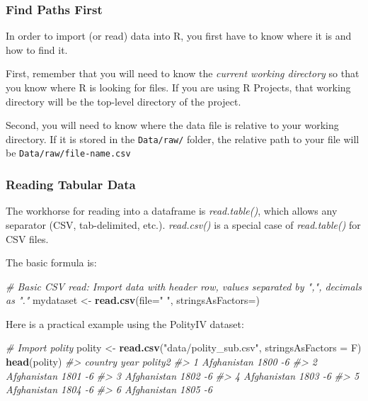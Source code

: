 \documentclass[
]{book}
\newenvironment{Shaded}{\begin{snugshade}}{\end{snugshade}}
\newcommand{\CommentTok}[1]{\textcolor[rgb]{0.56,0.35,0.01}{\textit{#1}}}
\newcommand{\DataTypeTok}[1]{\textcolor[rgb]{0.13,0.29,0.53}{#1}}
\newcommand{\KeywordTok}[1]{\textcolor[rgb]{0.13,0.29,0.53}{\textbf{#1}}}
\newcommand{\NormalTok}[1]{#1}
\newcommand{\StringTok}[1]{\textcolor[rgb]{0.31,0.60,0.02}{#1}}
\begin{document}
\hypertarget{find-paths-first}{%
\subsubsection*{Find Paths First}\label{find-paths-first}}

In order to import (or read) data into R, you first have to know where it is and how to find it.

First, remember that you will need to know the \emph{current working directory} so that you know where R is looking for files. If you are using R Projects, that working directory will be the top-level directory of the project.

Second, you will need to know where the data file is relative to your working directory. If it is stored in the \texttt{Data/raw/} folder, the relative path to your file will be \texttt{Data/raw/file-name.csv}

\hypertarget{reading-tabular-data}{%
\subsubsection*{Reading Tabular Data}\label{reading-tabular-data}}

The workhorse for reading into a dataframe is \emph{read.table()}, which allows any separator (CSV, tab-delimited, etc.). \emph{read.csv()} is a special case of \emph{read.table()} for CSV files.

The basic formula is:

\begin{Shaded}
\begin{Highlighting}[]
\CommentTok{# Basic CSV read: Import data with header row, values separated by ",", decimals as "."}
\NormalTok{mydataset <-}\StringTok{ }\KeywordTok{read.csv}\NormalTok{(}\DataTypeTok{file=}\StringTok{"  "}\NormalTok{, }\DataTypeTok{stringsAsFactors=}\NormalTok{)}
\end{Highlighting}
\end{Shaded}

Here is a practical example using the PolityIV dataset:

\begin{Shaded}
\begin{Highlighting}[]
\CommentTok{# Import polity}
\NormalTok{polity <-}\StringTok{ }\KeywordTok{read.csv}\NormalTok{(}\StringTok{"data/polity_sub.csv"}\NormalTok{, }\DataTypeTok{stringsAsFactors =}\NormalTok{ F)}
\KeywordTok{head}\NormalTok{(polity)}
\CommentTok{#>       country year polity2}
\CommentTok{#> 1 Afghanistan 1800      -6}
\CommentTok{#> 2 Afghanistan 1801      -6}
\CommentTok{#> 3 Afghanistan 1802      -6}
\CommentTok{#> 4 Afghanistan 1803      -6}
\CommentTok{#> 5 Afghanistan 1804      -6}
\CommentTok{#> 6 Afghanistan 1805      -6}
\end{Highlighting}
\end{Shaded}
\end{document}
